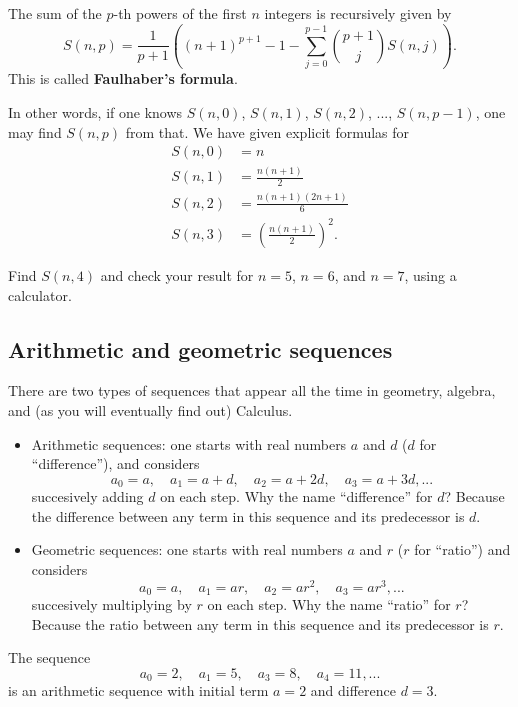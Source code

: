 \documentclass[nooutcomes]{ximera}
\begin{document}
\begin{callout}
  The sum of the $p$-th powers of the first $n$ integers is recursively given by $$S(n,p) = \frac{1}{p+1} \left((n+1)^{p+1} - 1 -\sum_{j=0}^{p-1} {{p+1}\choose j}S(n,j)\right).$$This is called {\bf Faulhaber's formula}.
\end{callout}
In other words, if one knows $S(n,0)$, $S(n,1)$, $S(n,2)$, ..., $S(n,p-1)$, one may find $S(n,p)$ from that. We have given explicit formulas for
\begin{align*}
  S(n,0) &= n \\ S(n,1) &= \frac{n(n+1)}{2} \\ S(n,2) &= \frac{n(n+1)(2n+1)}{6} \\ S(n,3) &= \left(\frac{n(n+1)}{2}\right)^2.
\end{align*}

\begin{exploration}
  Find $S(n,4)$ and check your result for $n=5$, $n=6$, and $n=7$, using a calculator.
\end{exploration}

\subsection{Arithmetic and geometric sequences}

There are two types of sequences that appear all the time in geometry, algebra, and (as you will eventually find out) Calculus.

\begin{itemize}
\item Arithmetic sequences: one starts with real numbers $a$ and $d$ ($d$ for ``difference''), and considers $$a_0 = a, \quad a_1 = a+d, \quad a_2 = a+2d, \quad a_3 = a+3d,...$$succesively adding $d$ on each step. Why the name ``difference'' for $d$? Because the difference between any term in this sequence and its predecessor is $d$.
\item Geometric sequences: one starts with real numbers $a$ and $r$ ($r$ for ``ratio'') and considers $$a_0 = a, \quad a_1 = ar, \quad a_2 = ar^2, \quad a_3 = ar^3,...$$succesively multiplying by $r$ on each step. Why the name ``ratio'' for $r$? Because the ratio between any term in this sequence and its predecessor is $r$.
\end{itemize}

\begin{example}
  The sequence $$a_0 = 2, \quad a_1 = 5, \quad a_3 = 8, \quad a_4 = 11,...$$is an arithmetic sequence with initial term $a=2$ and difference $d=3$.
\end{example}
\end{document}
